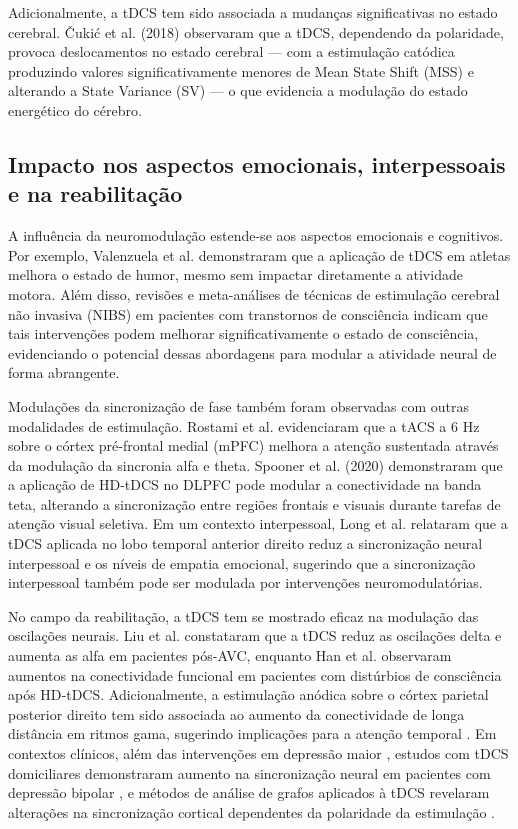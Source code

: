 Adicionalmente, a tDCS tem sido associada a mudanças significativas no estado cerebral. Čukić et al. (2018) \cite{cukic2018shift} observaram que a tDCS, dependendo da polaridade, provoca deslocamentos no estado cerebral — com a estimulação catódica produzindo valores significativamente menores de Mean State Shift (MSS) e alterando a State Variance (SV) — o que evidencia a modulação do estado energético do cérebro.

\subsection{Impacto nos aspectos emocionais, interpessoais e na reabilitação}

A influência da neuromodulação estende-se aos aspectos emocionais e cognitivos. Por exemplo, Valenzuela et al. \cite{valenzuela2019enhancement} demonstraram que a aplicação de tDCS em atletas melhora o estado de humor, mesmo sem impactar diretamente a atividade motora. Além disso, revisões e meta-análises de técnicas de estimulação cerebral não invasiva (NIBS) em pacientes com transtornos de consciência indicam que tais intervenções podem melhorar significativamente o estado de consciência, evidenciando o potencial dessas abordagens para modular a atividade neural de forma abrangente.

Modulações da sincronização de fase também foram observadas com outras modalidades de estimulação. Rostami et al. \cite{rostami2020transcranial} evidenciaram que a tACS a 6 Hz sobre o córtex pré-frontal medial (mPFC) melhora a atenção sustentada através da modulação da sincronia alfa e theta. Spooner et al. (2020) \cite{spooner2020hdtdcs} demonstraram que a aplicação de HD-tDCS no DLPFC pode modular a conectividade na banda teta, alterando a sincronização entre regiões frontais e visuais durante tarefas de atenção visual seletiva. Em um contexto interpessoal, Long et al. \cite{long2023transcranial} relataram que a tDCS aplicada no lobo temporal anterior direito reduz a sincronização neural interpessoal e os níveis de empatia emocional, sugerindo que a sincronização interpessoal também pode ser modulada por intervenções neuromodulatórias.

No campo da reabilitação, a tDCS tem se mostrado eficaz na modulação das oscilações neurais. Liu et al. \cite{liu2023effects} constataram que a tDCS reduz as oscilações delta e aumenta as alfa em pacientes pós-AVC, enquanto Han et al. \cite{han2022functional} observaram aumentos na conectividade funcional em pacientes com distúrbios de consciência após HD‑tDCS. Adicionalmente, a estimulação anódica sobre o córtex parietal posterior direito tem sido associada ao aumento da conectividade de longa distância em ritmos gama, sugerindo implicações para a atenção temporal \cite{tan2023selective}. Em contextos clínicos, além das intervenções em depressão maior \cite{singh2024evaluating}, estudos com tDCS domiciliares demonstraram aumento na sincronização neural em pacientes com depressão bipolar \cite{xiao2025enhanced}, e métodos de análise de grafos aplicados à tDCS revelaram alterações na sincronização cortical dependentes da polaridade da estimulação \cite{mancini2016assessing, pellegrino2019transcranial, schollmann2019anodal}.


